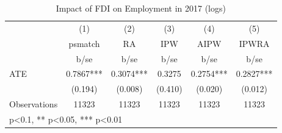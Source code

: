 \begin{table}[htbp]\centering
\def\sym#1{\ifmmode^{#1}\else\(^{#1}\)\fi}
\caption{Impact of FDI on Employment in 2017 (logs) }
\label{ates_emp}
\begin{tabular}{l*{5}{c}}
\hline\hline
                &\multicolumn{1}{c}{(1)}&\multicolumn{1}{c}{(2)}&\multicolumn{1}{c}{(3)}&\multicolumn{1}{c}{(4)}&\multicolumn{1}{c}{(5)}\\
                &\multicolumn{1}{c}{psmatch}&\multicolumn{1}{c}{RA}&\multicolumn{1}{c}{IPW}&\multicolumn{1}{c}{AIPW}&\multicolumn{1}{c}{IPWRA}\\
                &     b/se   &     b/se   &     b/se   &     b/se   &     b/se   \\
\hline
ATE             &   0.7867***&   0.3074***&   0.3275   &   0.2754***&   0.2827***\\
                &  (0.194)   &  (0.008)   &  (0.410)   &  (0.020)   &  (0.012)   \\
\hline
Observations    &    11323   &    11323   &    11323   &    11323   &    11323   \\
\hline\hline
\multicolumn{6}{l}{\footnotesize * p<0.1, ** p<0.05, *** p<0.01}\\
\end{tabular}
\end{table}
